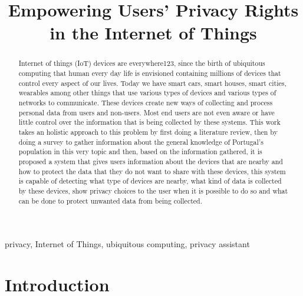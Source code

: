 \documentclass[conference]{IEEEtran}
\begin{document}
\title{Empowering Users' Privacy Rights in the Internet of Things\\
}

\author{
}

\maketitle

\begin{abstract}
Internet of things (IoT) devices are everywhere123, since the birth of ubiquitous
computing that human every day life is envisioned containing millions of devices
that control every aspect of our lives. Today we have smart cars, smart houses,
smart cities, wearables among other things that use various types of devices
and various types of networks to communicate. These devices create new ways
of collecting and process personal data from users and non-users.
Most end users are not even aware or have little control over the information that
is being collected by these systems. This work takes an holistic approach to this
problem by first doing a literature review, then by doing a survey to gather
information about the general knowledge of Portugal's population in this
very topic and then, based on the information gathered, it is proposed
a system that gives users information about the devices that are nearby
and how to protect the data that they do not want to share with these devices,
this system is capable of detecting what type of devices are nearby,
what kind of data is collected by these devices, show privacy choices
to the user when it is possible to do so and what can be done to protect
unwanted data from being collected.
\end{abstract}

\begin{IEEEkeywords}
privacy, Internet of Things, ubiquitous computing, privacy assistant
\end{IEEEkeywords}

\section{Introduction}
\end{document}
